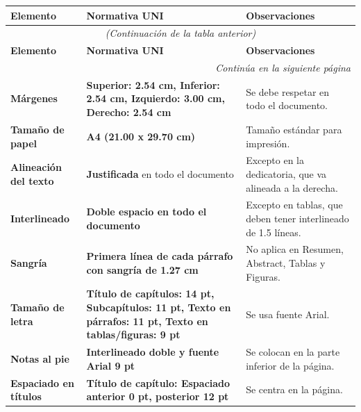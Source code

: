 \documentclass{report}
\begin{document}
\begin{longtable}{|l|p{7cm}|p{8cm}|}
    \hline
    \textbf{Elemento} & \textbf{Normativa UNI} & \textbf{Observaciones} \\ \hline
    \endfirsthead

    \multicolumn{3}{c}{{\textit{(Continuación de la tabla anterior)}}} \\ \hline
    \textbf{Elemento} & \textbf{Normativa UNI} & \textbf{Observaciones} \\ \hline
    \endhead

    \hline \multicolumn{3}{|r|}{{\textit{Continúa en la siguiente página}}} \\ \hline
    \endfoot

    \hline
    \endlastfoot

    \textbf{Márgenes} & \textbf{Superior: 2.54 cm, Inferior: 2.54 cm, Izquierdo: 3.00 cm, Derecho: 2.54 cm} & Se debe respetar en todo el documento. \\ \hline

    \textbf{Tamaño de papel} & \textbf{A4 (21.00 x 29.70 cm)} & Tamaño estándar para impresión. \\ \hline

    \textbf{Alineación del texto} & \textbf{Justificada} en todo el documento & Excepto en la dedicatoria, que va alineada a la derecha. \\ \hline

    \textbf{Interlineado} & \textbf{Doble espacio en todo el documento} & Excepto en tablas, que deben tener interlineado de 1.5 líneas. \\ \hline

    \textbf{Sangría} & \textbf{Primera línea de cada párrafo con sangría de 1.27 cm} & No aplica en Resumen, Abstract, Tablas y Figuras. \\ \hline

    \textbf{Tamaño de letra} & \textbf{Título de capítulos: 14 pt, Subcapítulos: 11 pt, Texto en párrafos: 11 pt, Texto en tablas/figuras: 9 pt} & Se usa fuente Arial. \\ \hline

    \textbf{Notas al pie} & \textbf{Interlineado doble y fuente Arial 9 pt} & Se colocan en la parte inferior de la página. \\ \hline

    \textbf{Espaciado en títulos} & \textbf{Título de capítulo: Espaciado anterior 0 pt, posterior 12 pt} & Se centra en la página. \\ \hline


\end{longtable}
\end{document}
